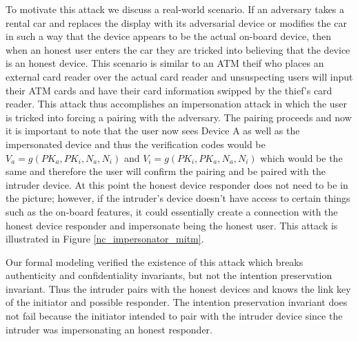 \documentclass{acm_proc_article-sp}
\begin{document}
To motivate this attack we discuss a real-world scenario. If an adversary takes a rental car and replaces the display with its adversarial device or modifies the car in such a way that the device appears to be the actual on-board device, then when an honest user enters the car they are tricked into believing that the device is an honest device. This scenario is similar to an ATM theif who places an external card reader over the actual card reader and unsuspecting users will input their ATM cards and have their card information swipped by the thief's card reader. This attack thus accomplishes an impersonation attack in which the user is tricked into forcing a pairing with the adversary. The pairing proceeds and now it is important to note that the user now sees Device A as well as the impersonated device and thus the verification codes would be $V_a = g(PK_a, PK_i, N_a, N_i)$ and $V_i = g(PK_i, PK_a, N_a, N_i)$ which would be the same and therefore the user will confirm the pairing and be paired with the intruder device. At this point the honest device responder does not need to be in the picture; however, if the intruder's device doesn't have access to certain things such as the on-board features, it could essentially create a connection with the honest device responder and impersonate being the honest user. This attack is illustrated in Figure \ref{nc_impersonator_mitm}.

Our formal modeling verified the existence of this attack which breaks authenticity and confidentiality invariants, but not the intention preservation invariant. Thus the intruder pairs with the honest devices and knows the link key of the initiator and possible responder. The intention preservation invariant does not fail because the initiator intended to pair with the intruder device since the intruder was impersonating an honest responder.
\end{document}

